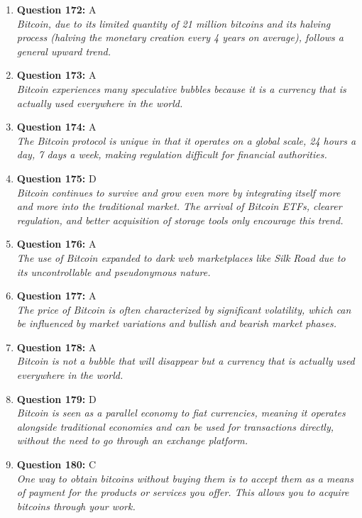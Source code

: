 \documentclass[12pt,a4paper]{article}
\begin{document}
\begin{enumerate}
\item \textbf{Question 172:} A
\\ \textit{Bitcoin, due to its limited quantity of 21 million bitcoins and its halving process (halving the monetary creation every 4 years on average), follows a general upward trend.}

\item \textbf{Question 173:} A
\\ \textit{Bitcoin experiences many speculative bubbles because it is a currency that is actually used everywhere in the world.}

\item \textbf{Question 174:} A
\\ \textit{The Bitcoin protocol is unique in that it operates on a global scale, 24 hours a day, 7 days a week, making regulation difficult for financial authorities.}

\item \textbf{Question 175:} D
\\ \textit{Bitcoin continues to survive and grow even more by integrating itself more and more into the traditional market. The arrival of Bitcoin ETFs, clearer regulation, and better acquisition of storage tools only encourage this trend.}

\item \textbf{Question 176:} A
\\ \textit{The use of Bitcoin expanded to dark web marketplaces like Silk Road due to its uncontrollable and pseudonymous nature.}

\item \textbf{Question 177:} A
\\ \textit{The price of Bitcoin is often characterized by significant volatility, which can be influenced by market variations and bullish and bearish market phases.}

\item \textbf{Question 178:} A
\\ \textit{Bitcoin is not a bubble that will disappear but a currency that is actually used everywhere in the world.}

\item \textbf{Question 179:} D
\\ \textit{Bitcoin is seen as a parallel economy to fiat currencies, meaning it operates alongside traditional economies and can be used for transactions directly, without the need to go through an exchange platform.}

\item \textbf{Question 180:} C
\\ \textit{One way to obtain bitcoins without buying them is to accept them as a means of payment for the products or services you offer. This allows you to acquire bitcoins through your work.}


\end{enumerate}
\end{document}
